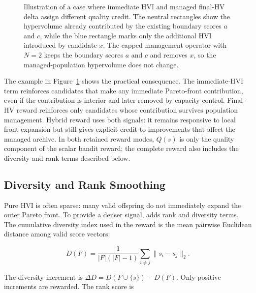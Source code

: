 \documentclass[../main.tex]{subfiles}
\begin{document}
\begin{figure}[H]
\begin{minipage}{0.49\linewidth}
  \end{minipage}
  \caption{Illustration of a case where immediate HVI and managed final-HV delta assign different quality credit. The neutral rectangles show the hypervolume already contributed by the existing boundary scores $a$ and $c$, while the blue rectangle marks only the additional HVI introduced by candidate $x$. The capped management operator with $N=2$ keeps the boundary scores $a$ and $c$ and removes $x$, so the managed-population hypervolume does not change.}
  \label{fig:immediate-final-reward-example}
\end{figure}

The example in Figure~\ref{fig:immediate-final-reward-example} shows the practical consequence. The immediate-HVI term reinforces candidates that make any immediate Pareto-front contribution, even if the contribution is interior and later removed by capacity control. Final-HV reward reinforces only candidates whose contribution survives population management. Hybrid reward uses both signals: it remains responsive to local front expansion but still gives explicit credit to improvements that affect the managed archive. In both retained reward modes, $Q(s)$ is only the quality component of the scalar bandit reward; the complete reward also includes the diversity and rank terms described below.

\subsection{Diversity and Rank Smoothing}

Pure HVI is often sparse: many valid offspring do not immediately expand the outer Pareto front. To provide a denser signal, \bmab{} adds rank and diversity terms. The cumulative diversity index used in the reward is the mean pairwise Euclidean distance among valid score vectors:

\begin{equation}
  D(F)
  =
  \frac{1}{|F|(|F|-1)}
  \sum_{i \ne j} \|s_i-s_j\|_2.
\end{equation}

The diversity increment is $\Delta D = D(F\cup\{s\})-D(F)$. Only positive increments are rewarded. The rank score is
\end{document}
